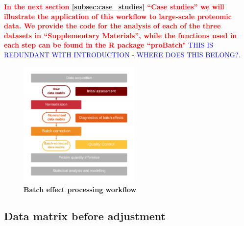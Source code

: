\documentclass[num-refs]{wiley-article}
\begin{document}
\textcolor{red}{\textbf{In the next section \ref{subsec:case_studies} “Case studies” we will illustrate the application of this workflow to large-scale proteomic data. We provide the code for the analysis of each of the three datasets in “Supplementary Materials”, while the functions used in each step can be found in the R package “proBatch"}} \textcolor{blue}{THIS IS REDUNDANT WITH INTRODUCTION - WHERE DOES THIS BELONG?}. 

\begin{figure}[bt]
	\center
	\includegraphics[width=6cm]{figures/Fig0_workflow_staircase}
	\caption[Batch effect correction workflow]
	{\textbf{Batch effect processing workflow}}
	\label{fig:batch_fig1_workflow}
\end{figure}


\subsection{Data matrix before adjustment}
\end{document}

